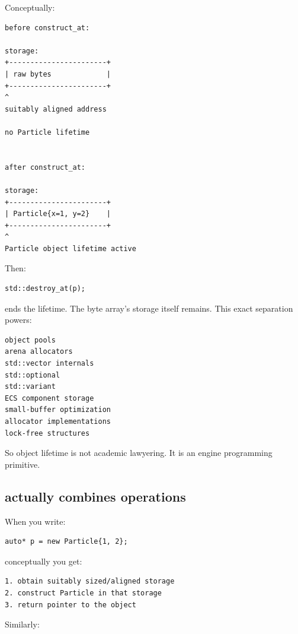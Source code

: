 Conceptually:

\begin{verbatim}
before construct_at:

storage:
+-----------------------+
| raw bytes             |
+-----------------------+
^
suitably aligned address

no Particle lifetime


after construct_at:

storage:
+-----------------------+
| Particle{x=1, y=2}    |
+-----------------------+
^
Particle object lifetime active
\end{verbatim}

Then:

\begin{verbatim}
std::destroy_at(p);
\end{verbatim}

ends the  lifetime. The byte array's storage itself remains. This exact separation powers:

\begin{verbatim}
object pools
arena allocators
std::vector internals
std::optional
std::variant
ECS component storage
small-buffer optimization
allocator implementations
lock-free structures
\end{verbatim}

So object lifetime is not academic lawyering. It is an engine programming primitive.

\subsection{\texorpdfstring{ actually combines operations}{ actually combines operations}}\label{01-foundations-i-ch002-new-actually-combines-operations}

\hypertarget{01-foundations-i-ch002-new-actually-combines-operations}{}

When you write:

\begin{verbatim}
auto* p = new Particle{1, 2};
\end{verbatim}

conceptually you get:

\begin{verbatim}
1. obtain suitably sized/aligned storage
2. construct Particle in that storage
3. return pointer to the object
\end{verbatim}

Similarly:

